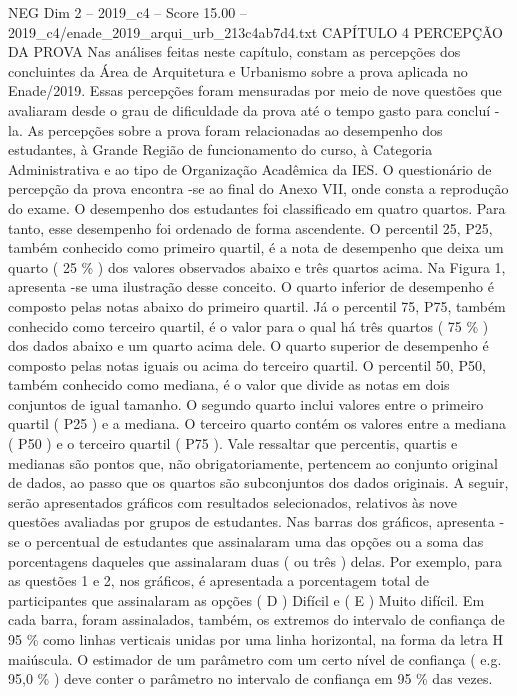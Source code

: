 \begin{textsample}{NEG Dim 2 – 2019\_c4 – Score 15.00 – 2019\_c4/enade\_2019\_arqui\_urb\_213c4ab7d4.txt}  \label{ex:f2_neg_390}
CAPÍTULO 4 PERCEPÇÃO DA PROVA Nas análises feitas neste capítulo, constam as percepções dos concluintes da Área de Arquitetura e Urbanismo sobre a prova aplicada no Enade/2019.
Essas percepções foram mensuradas por meio de nove questões que avaliaram desde o grau de dificuldade da prova até o tempo gasto para concluí -la.
As percepções sobre a prova foram relacionadas ao desempenho dos estudantes, à Grande Região de funcionamento do curso, à Categoria Administrativa e ao tipo de Organização Acadêmica da IES.
O questionário de percepção da prova encontra -se ao final do Anexo VII, onde consta a reprodução do exame.
O desempenho dos estudantes foi classificado em quatro quartos.
Para tanto, esse desempenho foi ordenado de forma ascendente.
O percentil 25, P25, também conhecido como primeiro quartil, é a nota de desempenho que deixa um quarto ( 25 \% ) dos valores observados abaixo e três quartos acima.
Na Figura 1, apresenta -se uma ilustração desse conceito.
O quarto inferior de desempenho é composto pelas notas abaixo do primeiro quartil.
Já o percentil 75, P75, também conhecido como terceiro quartil, é o valor para o qual há três quartos ( 75 \% ) dos dados abaixo e um quarto acima dele.
O quarto superior de desempenho é composto pelas notas iguais ou acima do terceiro quartil.
O percentil 50, P50, também conhecido como mediana, é o valor que divide as notas em dois conjuntos de igual tamanho.
O segundo quarto inclui valores entre o primeiro quartil ( P25 ) e a mediana.
O terceiro quarto contém os valores entre a mediana ( P50 ) e o terceiro quartil ( P75 ).
Vale ressaltar que percentis, quartis e medianas são pontos que, não obrigatoriamente, pertencem ao conjunto original de dados, ao passo que os quartos são subconjuntos dos dados originais.
A seguir, serão apresentados gráficos com resultados selecionados, relativos às nove questões avaliadas por grupos de estudantes.
Nas barras dos gráficos, apresenta -se o percentual de estudantes que assinalaram uma das opções ou a soma das porcentagens daqueles que assinalaram duas ( ou três ) delas.
Por exemplo, para as questões 1 e 2, nos gráficos, é apresentada a porcentagem total de participantes que assinalaram as opções ( D ) Difícil e ( E ) Muito difícil.
Em cada barra, foram assinalados, também, os extremos do intervalo de confiança de 95 \% como linhas verticais unidas por uma linha horizontal, na forma da letra H maiúscula.
O estimador de um parâmetro com um certo nível de confiança ( e.g. 95,0 \% ) deve conter o parâmetro no intervalo de confiança em 95 \% das vezes.

\end{textsample}

